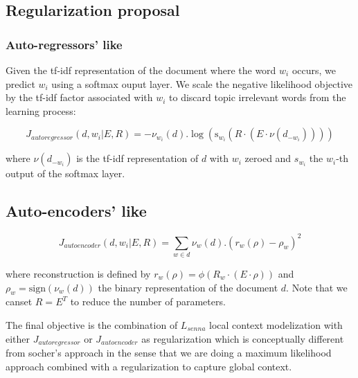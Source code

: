 \documentclass[11pt]{article} %
\begin{document}
\subsection{Regularization proposal}
\subsubsection{Auto-regressors' like}

Given the tf-idf representation of the document where the word $w_i$
occurs, we predict $w_i$ using a softmax ouput layer.  We scale the
negative likelihood objective by the tf-idf factor associated with
$w_i$ to discard topic irrelevant words from the learning process:

\[
J_{autoregressor} (d,w_i|E,R) = -\nu_{w_i}(d) . \log\left( \mathrm{s}_{w_i}\left(R\cdot \left(E \cdot \nu\left(d_{-w_i}\right)\right)\right)\right)
\]

where $\nu\left(d_{-w_i}\right)$ is the tf-idf representation of $d$
with $w_i$ zeroed and $s_{w_i}$ the $w_i$-th output of the softmax
layer.

\subsection{Auto-encoders' like}
\[
J_{autoencoder} (d,w_i| E,R) = \sum_{w\in d} \nu_w\left(d\right) . \left( r_w \left( \rho \right) - \rho_w \right)^2 
\]

where reconstruction is defined by $r_w(\rho) =
\phi\left(R_w\cdot\left(E\cdot\rho\right)\right)$ and $\rho_w =
\mathrm{sign}\left(\nu_w\left(d\right)\right)$ the binary
representation of the document $d$. Note that we canset $R=E^T$ to
reduce the number of parameters.

The final objective is the combination of $L_{senna} $ local context
modelization with either $J_{autoregressor}$ or $J_{autoencoder}$ as
regularization which is conceptually different from socher's approach
in the sense that we are doing a maximum likelihood approach combined
with a regularization to capture global context.
\end{document}
